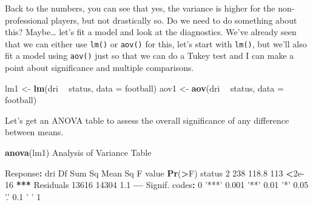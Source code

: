 \documentclass[
]{book}
\newenvironment{Shaded}{\begin{snugshade}}{\end{snugshade}}
\newcommand{\DataTypeTok}[1]{\textcolor[rgb]{0.13,0.29,0.53}{#1}}
\newcommand{\DecValTok}[1]{\textcolor[rgb]{0.00,0.00,0.81}{#1}}
\newcommand{\ErrorTok}[1]{\textcolor[rgb]{0.64,0.00,0.00}{\textbf{#1}}}
\newcommand{\FloatTok}[1]{\textcolor[rgb]{0.00,0.00,0.81}{#1}}
\newcommand{\KeywordTok}[1]{\textcolor[rgb]{0.13,0.29,0.53}{\textbf{#1}}}
\newcommand{\NormalTok}[1]{#1}
\newcommand{\OperatorTok}[1]{\textcolor[rgb]{0.81,0.36,0.00}{\textbf{#1}}}
\newcommand{\StringTok}[1]{\textcolor[rgb]{0.31,0.60,0.02}{#1}}
\begin{document}
Back to the numbers, you can see that yes, the variance is higher for the non-professional players, but not drastically so. Do we need to do something about this? Maybe\ldots{} let's fit a model and look at the diagnostics. We've already seen that we can either use \texttt{lm()} or \texttt{aov()} for this, let's start with \texttt{lm()}, but we'll also fit a model using \texttt{aov()} just so that we can do a Tukey test and I can make a point about significance and multiple comparisons.

\begin{Shaded}
\begin{Highlighting}[]
\NormalTok{lm1 <-}\StringTok{ }\KeywordTok{lm}\NormalTok{(dri }\OperatorTok{~}\StringTok{ }\NormalTok{status, }\DataTypeTok{data =}\NormalTok{ football)}
\NormalTok{aov1 <-}\StringTok{ }\KeywordTok{aov}\NormalTok{(dri }\OperatorTok{~}\StringTok{ }\NormalTok{status, }\DataTypeTok{data =}\NormalTok{ football)}
\end{Highlighting}
\end{Shaded}

Let's get an ANOVA table to assess the overall significance of any difference between means.

\begin{Shaded}
\begin{Highlighting}[]
\KeywordTok{anova}\NormalTok{(lm1)}
\NormalTok{Analysis of Variance Table}

\NormalTok{Response}\OperatorTok{:}\StringTok{ }\NormalTok{dri}
\NormalTok{             Df Sum Sq Mean Sq F value }\KeywordTok{Pr}\NormalTok{(}\OperatorTok{>}\NormalTok{F)    }
\NormalTok{status        }\DecValTok{2}    \DecValTok{238}   \FloatTok{118.8}     \DecValTok{113} \OperatorTok{<}\FloatTok{2e-16} \OperatorTok{**}\ErrorTok{*}
\NormalTok{Residuals }\DecValTok{13616}  \DecValTok{14304}     \FloatTok{1.1}                   
\OperatorTok{---}
\NormalTok{Signif. codes}\OperatorTok{:}\StringTok{  }\DecValTok{0} \StringTok{'***'} \FloatTok{0.001} \StringTok{'**'} \FloatTok{0.01} \StringTok{'*'} \FloatTok{0.05} \StringTok{'.'} \FloatTok{0.1} \StringTok{' '} \DecValTok{1}
\end{Highlighting}
\end{Shaded}
\end{document}
